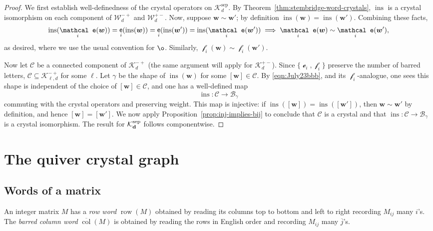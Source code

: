 \documentclass[12pt]{amsart}
\newcommand{\bs}{\boldsymbol}
\DeclareMathOperator{\tabe}{{\sf e}}
\DeclareMathOperator{\worde}{{\mathcal e}}
\DeclareMathOperator{\wordf}{{\mathcal f}}
\theoremstyle{definition}
\theoremstyle{remark}
\begin{document}
\begin{proof}
We first establish well-definedness of the crystal operators on ${\mathcal K}_d^{\operatorname{sep}}$. 
By Theorem~\ref{thm:stembridge-word-crystals}, $\operatorname{ins}$
is a crystal isomorphism on each component of ${\mathcal W}_d^{-+}$ and
${\mathcal W}_d^{+-}$. Now, suppose ${\bs w}\sim {\bs w}'$; 
by definition $\operatorname{ins}({\bs w})=\operatorname{ins}({\bs w}')$. Combining these facts,
\begin{equation}
\label{eqn:July23bbb}
\operatorname{ins}(\worde_i({\bs w}))=\tabe_i(\operatorname{ins}({\bs w}))=\tabe_i(\operatorname{ins}({\bs w}'))
=\operatorname{ins}(\worde_i({\bs w}'))\implies \worde_i({\bs w})\sim \worde_i({\bs w}'),
\end{equation}
as desired, where we use the usual convention for $\o$. Similarly,
$\wordf_i({\bs w})\sim \wordf_i({\bs w}')$.

Now let ${\mathcal C}$ be a connected component of ${\mathcal K}_d^{-+}$ (the same argument will apply for
${\mathcal K}_d^{+-}$). Since $\{\worde_i,\wordf_i\}$ preserve the number
of barred letters, ${\mathcal C}\subseteq {\mathcal K}_{\ell,d}^{-+}$ for some $\ell$. Let $\gamma$ be the shape
of $\operatorname{ins}({\bs w})$ for some $[{\bs w}]\in {\mathcal C}$. By \eqref{eqn:July23bbb}, and its $\wordf_i$-analogue,
one sees this shape is independent of the
choice of $[{\bs w}]\in {\mathcal C}$, and one has a well-defined map
\[\operatorname{ins}:{\mathcal C}\longrightarrow {\mathcal B}_\gamma\]
commuting with the crystal operators and preserving weight.
This map is injective: if
$\operatorname{ins}([{\bs w}])=\operatorname{ins}([{\bs w}'])$, then
${\bs w}\sim{\bs w}'$ by definition, and hence
$[{\bs w}]=[{\bs w}']$. We now apply 
Proposition~\ref{prop:inj-implies-bij} to conclude that ${\mathcal C}$ is a crystal and that
$\operatorname{ins}:{\mathcal C}\to{\mathcal B}_\gamma$ is a crystal isomorphism.
The result for ${\mathcal K}_{\bf d}^{\operatorname{sep}}$ follows componentwise.
\end{proof}
\section{The quiver crystal graph}\label{sec:quivercrystalgraph}
\subsection{Words of a matrix}\label{sec:S4}

An integer matrix $M$ has a \emph{row word} 
${\operatorname{row}}(M)$ obtained by reading its columns top to bottom and left to right recording $M_{ij}$ many $i$'s. The \emph{barred column word} $\overline{{\operatorname{col}}}(M)$
is obtained by reading the rows in English order and recording $M_{ij}$ many $\overline j$'s. 
\end{document}
